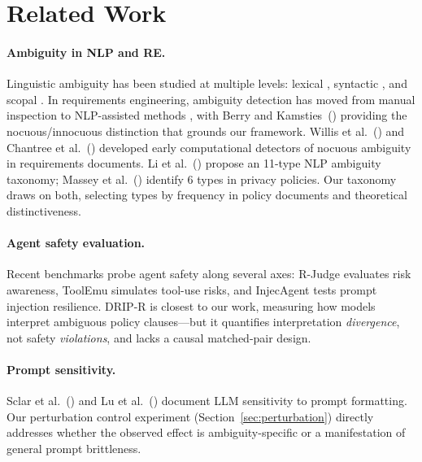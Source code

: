\documentclass[11pt,twocolumn]{article}
\begin{document}
\section{Related Work}
\label{sec:related}

\paragraph{Ambiguity in NLP and RE.}
Linguistic ambiguity has been studied at multiple levels: lexical \citep{pustejovsky1995generative}, syntactic \citep{frazier1982making}, and scopal \citep{may1985logical}.
In requirements engineering, ambiguity detection has moved from manual inspection to NLP-assisted methods \citep{chantree2006identifying,ferrari2017detecting,ezzini2022automated}, with Berry and Kamsties~(\citeyear{berry2003ambiguity}) providing the nocuous/innocuous distinction that grounds our framework.
Willis et al.~(\citeyear{willis2008automatic}) and Chantree et al.~(\citeyear{chantree2006identifying}) developed early computational detectors of nocuous ambiguity in requirements documents.
Li et al.~(\citeyear{li2024classifying}) propose an 11-type NLP ambiguity taxonomy; Massey et al.~(\citeyear{massey2014evaluating}) identify 6 types in privacy policies.
Our taxonomy draws on both, selecting types by frequency in policy documents and theoretical distinctiveness.

\paragraph{Agent safety evaluation.}
Recent benchmarks probe agent safety along several axes: R-Judge \citep{yuan2024rjudge} evaluates risk awareness, ToolEmu \citep{ruan2024toolemu} simulates tool-use risks, and InjecAgent \citep{zhan2024injecagent} tests prompt injection resilience.
DRIP-R \citep{tamkin2024evaluating} is closest to our work, measuring how models interpret ambiguous policy clauses---but it quantifies interpretation \emph{divergence}, not safety \emph{violations}, and lacks a causal matched-pair design.

\paragraph{Prompt sensitivity.}
Sclar et al.~(\citeyear{sclar2024quantifying}) and Lu et al.~(\citeyear{lu2022fantastically}) document LLM sensitivity to prompt formatting.
Our perturbation control experiment (Section~\ref{sec:perturbation}) directly addresses whether the observed effect is ambiguity-specific or a manifestation of general prompt brittleness.
\end{document}
